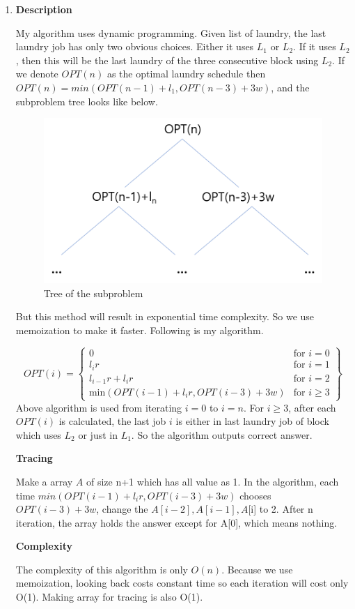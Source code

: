 \documentclass[a4paper,11pt]{article}
\begin{document}
\begin{enumerate}
\item
{\bf Description}

My algorithm uses dynamic programming. Given list of laundry, the last laundry job has only two obvious choices. Either it uses $L_1$ or $L_2$. If it uses $L_2$, then this will be the last laundry of the three consecutive block using $L_2$. If we denote $OPT(n)$ as the optimal laundry schedule then $OPT(n) = min(OPT(n-1) + l_1 , OPT(n-3) + 3w)$, and the subproblem tree looks like below.
\begin{figure}[hbt]
	\centering
	\includegraphics[scale=0.5]{figure1.png}
	\caption{Tree of the subproblem}
\end{figure}

But this method will result in exponential time complexity. So we use memoization to make it faster. Following is my algorithm.

\[
  OPT(i) = \left.
  \begin{cases}
    0 & \text{for } i = 0 \\
    l_i r & \text{for } i = 1 \\
    l_{i-1} r + l_i  r & \text{for } i =2 \\
    \text{min}(OPT(i-1)+l_ir, OPT(i-3) + 3w)  & \text{for } i \geq 3
  \end{cases}
  \right\} 
\]
Above algorithm is used from iterating $i=0$ to $i=n$. For $i \geq 3$, after each $OPT(i)$  is calculated, the last job $i$ is either in last laundry job of block which uses $L_2$ or just in $L_1$. So the algorithm outputs correct answer.

{\bf Tracing}

Make a array $A$ of size n+1 which has all value as 1.
In the algorithm, each time ${min}(OPT(i-1)+l_ir, OPT(i-3) + 3w)$ chooses $OPT(i-3) + 3w$, change the $A[i-2],A[i-1],A$[i] to 2. After n iteration, the array holds the answer except for A[0], which means nothing.

{\bf Complexity}

The complexity of this algorithm is only $O(n)$. Because we use memoization, looking back costs constant time so each iteration will cost only O(1). Making array for tracing is also O(1).
\end{enumerate}
\end{document}
